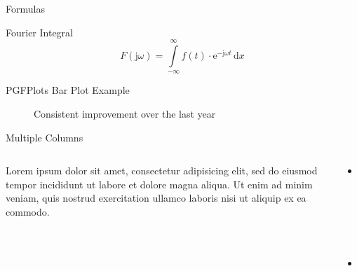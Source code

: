 \documentclass[newPxFont]{beamer}
\begin{document}

\begin{frame}{Formulas}
\begin{block}{Fourier Integral}
\[
F(\textrm{j}\omega) = \displaystyle \int \limits_{-\infty}^{\infty} \! f(t)\cdot\textrm{e}^{-\textrm{j}\omega t}  \, \mathrm{d} x
\]
\end{block}
\end{frame}


\begin{frame}{PGFPlots Bar Plot Example}
	\begin{figure}[h]
		\centering
		\caption{Consistent improvement over the last year}
		\end{figure}
\end{frame}



\begin{frame}{Multiple Columns}
\begin{columns}
\begin{column}{.48\linewidth}
		Lorem ipsum dolor sit amet, consectetur adipisicing elit, sed do eiusmod
		tempor incididunt ut labore et dolore magna aliqua. Ut enim ad minim veniam,
		quis nostrud exercitation ullamco laboris nisi ut aliquip ex ea commodo.
\end{column}
\begin{column}{.48\linewidth}
		\begin{itemize}
        	\item Point 1
        	\item Point 2
		\end{itemize}
	\end{column}
	\end{columns}
\end{frame}
\end{document}

